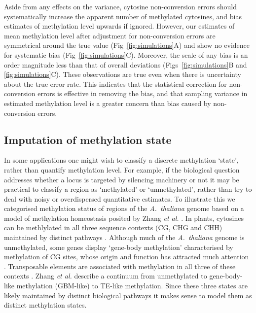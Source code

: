 \documentclass[10pt,draft,letterpaper]{article}
\begin{document}
Aside from any effects on the variance, cytosine non-conversion errors should systematically increase the apparent number of methylated cytosines, and bias estimates of methylation level upwards if ignored.
However, our estimates of mean methylation level after adjustment for non-conversion errors are symmetrical around the true value (Fig~\ref{fig:simulations}A) and show no evidence for systematic bias (Fig~\ref{fig:simulations}C).
Moreover, the scale of any bias is an order magnitude less than that of overall deviations (Figs~\ref{fig:simulations}B and \ref{fig:simulations}C).
These observations are true even when there is uncertainty about the true error rate.
This indicates that the statistical correction for non-conversion errors is effective in removing the bias, and that sampling variance in estimated methylation level is a greater concern than bias caused by non-conversion errors.

\subsection*{Imputation of methylation state}

In some applications one might wish to classify a discrete methylation `state', rather than quantify methylation level.
For example, if the biological question addresses whether a locus is targeted by silencing machinery or not it may be practical to classify a region as `methylated' or `unmethylated', rather than try to deal with noisy or overdispersed quantitative estimates.
To illustrate this we categorised methylation status of regions of the \emph{A.~thaliana} genome based on a model of methylation homeostasis posited by Zhang \textit{et al.} \cite{zhang2020natural}.
In plants, cytosines can be methlylated in all three sequence contexts (CG, CHG and CHH) maintained by distinct pathways \cite{law2010establishing}.
Although much of the \emph{A.~thaliana} genome is unmethylated, some genes display `gene-body methylation' characterised by methylation of CG sites, whose origin and function has attracted much attention \cite{muyle2022gene}. 
Transposable elements are associated with methylation in all three of these contexts \cite{cokus2008shotgun, lister2008highly}.
Zhang \textit{et al.} \cite{zhang2020natural} describe a continuum from unmethylated to gene-body-like methylation (GBM-like) to TE-like methylation.
Since these three states are likely maintained by distinct biological pathways it makes sense to model them as distinct methylation states.
\end{document}
